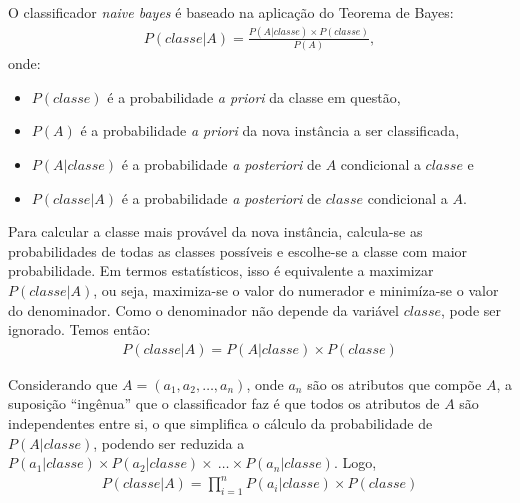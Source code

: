 O classificador \textit{naive bayes} é baseado na aplicação do Teorema de Bayes:
%
\begin{align}
P(classe|A) = \frac{P(A|classe) \times P(classe)}{P(A)},
\end{align}
%
onde:

\begin{itemize}
    \item \(P(classe)\) é a probabilidade \textit{a priori} da classe em questão,
    \item \(P(A)\) é a probabilidade \textit{a priori} da nova instância a ser classificada,
    \item \(P(A|classe)\) é a probabilidade \textit{a posteriori} de \(A\) condicional a \(classe\) e
    \item \(P(classe|A)\) é a probabilidade \textit{a posteriori} de \(classe\) condicional a \(A\).
\end{itemize}

Para calcular a classe mais provável da nova instância, calcula-se as probabilidades de todas as classes possíveis e escolhe-se a classe com maior probabilidade. Em termos estatísticos, isso é equivalente a maximizar \(P(classe|A)\), ou seja, maximiza-se o valor do numerador e minimíza-se o valor do denominador. Como o denominador não depende da variável \(classe\), pode ser ignorado. Temos então:
%
\begin{align}
P(classe|A) = P(A|classe) \times P(classe)
\end{align}

Considerando que \(A= ( a_1, a_2, \ldots , a_n)\), onde \(a_n\) são os atributos que compõe \(A\), a suposição ``ingênua'' que o classificador faz é que todos os atributos de \(A\) são independentes entre si, o que simplifica o cálculo da probabilidade de \(P(A|classe)\), podendo ser reduzida a \(P(a_1|classe) \times P(a_2|classe) \times\ \ldots \times P(a_n|classe)\). Logo,
%
\begin{align}
P(classe|A) = \prod_{i=1}^{n} P(a_i|classe) \times P(classe)
\end{align}
